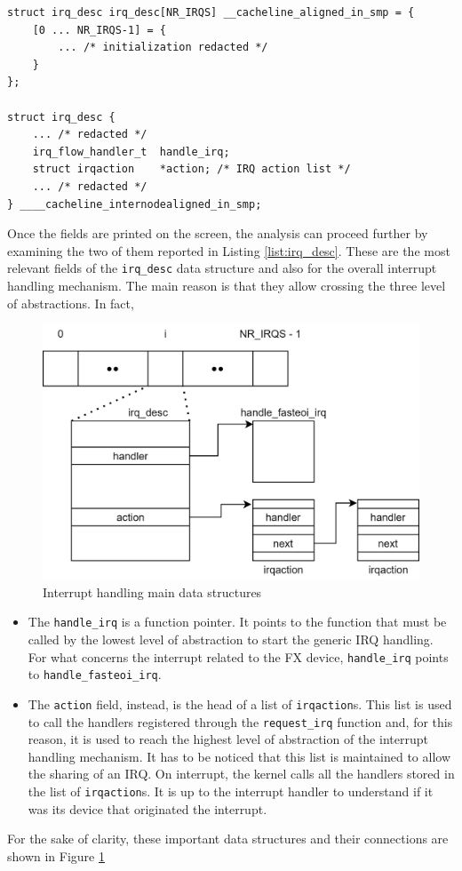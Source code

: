 \begin{lstlisting}[style=c, caption={\texttt{irq\_desc} data structure (redacted) and array definition}, label={list:irq_desc}]
struct irq_desc irq_desc[NR_IRQS] __cacheline_aligned_in_smp = {
	[0 ... NR_IRQS-1] = {
        ... /* initialization redacted */
	}
};

struct irq_desc {
    ... /* redacted */
	irq_flow_handler_t	handle_irq;
	struct irqaction	*action; /* IRQ action list */
    ... /* redacted */
} ____cacheline_internodealigned_in_smp;
\end{lstlisting}
Once the fields are printed on the screen, the analysis can proceed further by examining the two of them reported in Listing \ref{list:irq_desc}. These are the most relevant fields of the \texttt{irq\_desc} data structure and also for the overall interrupt handling mechanism. The main reason is that they allow crossing the three level of abstractions. In fact, 
\begin{figure}[t]
    \centering
    \includegraphics{images/interrupt-handling.png}
    \caption{Interrupt handling main data structures}
    \label{fig:interrupt-handling}
\end{figure}
\begin{itemize}
    \item The \texttt{handle\_irq} is a function pointer. It points to the function that must be called by the lowest level of abstraction to start the generic IRQ handling. For what concerns the interrupt related to the FX device, \texttt{handle\_irq} points to \texttt{handle\_fasteoi\_irq}.
    \item The \texttt{action} field, instead, is the head of a list of \texttt{irqaction}s. This list is used to call the handlers registered through the \texttt{request\_irq} function and, for this reason, it is used to reach the highest level of abstraction of the interrupt handling mechanism. It has to be noticed that this list is maintained to allow the sharing of an IRQ. On interrupt, the kernel calls all the handlers stored in the list of \texttt{irqaction}s. It is up to the interrupt handler to understand if it was its device that originated the interrupt.
\end{itemize}
For the sake of clarity, these important data structures and their connections are shown in Figure \ref{fig:interrupt-handling}

